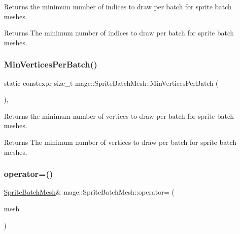 Returns the minimum number of indices to draw per batch for sprite batch meshes.

\begin{DoxyReturn}{Returns}
The minimum number of indices to draw per batch for sprite batch meshes. 
\end{DoxyReturn}
\hypertarget{classmage_1_1_sprite_batch_mesh_a489cec36c8cee8ece130b2c22597c711}{}\label{classmage_1_1_sprite_batch_mesh_a489cec36c8cee8ece130b2c22597c711} 
\subsubsection{\texorpdfstring{Min\+Vertices\+Per\+Batch()}{MinVerticesPerBatch()}}
{\footnotesize\ttfamily static constexpr size\+\_\+t mage\+::\+Sprite\+Batch\+Mesh\+::\+Min\+Vertices\+Per\+Batch (\begin{DoxyParamCaption}{ }\end{DoxyParamCaption})\hspace{0.3cm}{\ttfamily [static]}, {\ttfamily [noexcept]}}

Returns the minimum number of vertices to draw per batch for sprite batch meshes.

\begin{DoxyReturn}{Returns}
The minimum number of vertices to draw per batch for sprite batch meshes. 
\end{DoxyReturn}
\hypertarget{classmage_1_1_sprite_batch_mesh_a6b2b8f8aca90b9bb1967e6cdbf4d06da}{}\label{classmage_1_1_sprite_batch_mesh_a6b2b8f8aca90b9bb1967e6cdbf4d06da} 
\subsubsection{\texorpdfstring{operator=()}{operator=()}\hspace{0.1cm}{\footnotesize\ttfamily [1/2]}}
{\footnotesize\ttfamily \hyperlink{classmage_1_1_sprite_batch_mesh}{Sprite\+Batch\+Mesh}\& mage\+::\+Sprite\+Batch\+Mesh\+::operator= (\begin{DoxyParamCaption}\item[{const \hyperlink{classmage_1_1_sprite_batch_mesh}{Sprite\+Batch\+Mesh} \&}]{mesh }\end{DoxyParamCaption})\hspace{0.3cm}{\ttfamily [delete]}}

